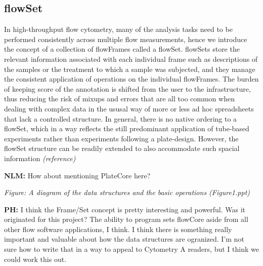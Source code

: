 \documentclass[12pt]{article}
\begin{document}
\subsection{flowSet}
In high-throughput flow cytometry, many of the analysis tasks need to
be performed consistently across multiple flow measurements, hence we
introduce the concept of a collection of flowFrames called a
flowSet. flowSets store the relevant information associated with each
individual frame such as descriptions of the samples or the treatment
to which a sample was subjected, and they manage the consistent
application of operations on the individual flowFrames. The burden of
keeping score of the annotation is shifted from the user to the
infrastructure, thus reducing the risk of mixups and errors that are
all too common when dealing with complex data in the ususal way of
more or less ad hoc spreadsheets that lack a controlled structure. In
general, there is no native ordering to a flowSet, which in a way
reflects the still predominant application of tube-based experiments
rather than experiments following a plate-design. However, the flowSet
structure can be readily extended to also accommodate such spacial
information \textit{(reference)}

{\bf NLM:} How about mentioning PlateCore here?


\textit{Figure: A diagram of the data structures and the basic
  operations (Figure1.ppt)}

{\bf PH:} I think the Frame/Set concept is pretty interesting and
powerful. Was it originated for this project? The ability to program
sets flowCore aside from all other flow software applications, I
think. I think there is something really important and valuable about
how the data structures are ogranized. I'm not sure how to write that
in a way to appeal to Cytometry A readers, but I think we could work
this out.
\end{document}
